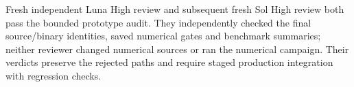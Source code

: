 Fresh independent Luna High review and subsequent fresh Sol High review both pass the bounded prototype audit. They independently checked the final source/binary identities, saved numerical gates and benchmark summaries; neither reviewer changed numerical sources or ran the numerical campaign. Their verdicts preserve the rejected paths and require staged production integration with regression checks.
